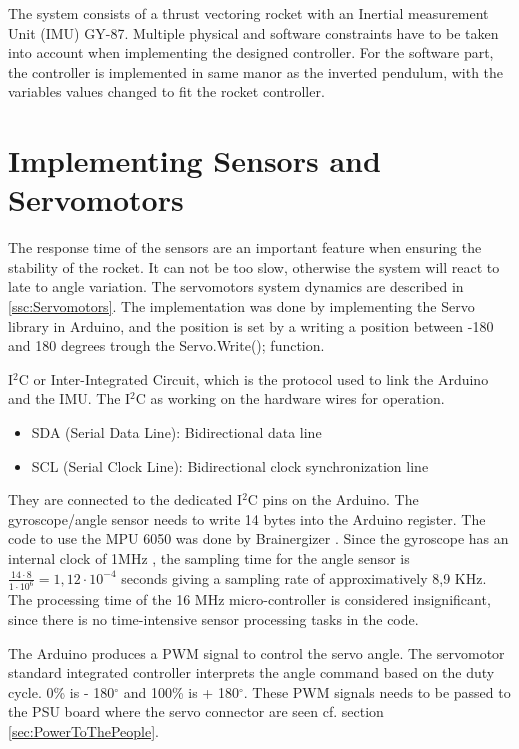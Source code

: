 The system consists of a thrust vectoring rocket with an Inertial measurement Unit (IMU) GY-87.
Multiple physical and software constraints have to be taken into account when implementing the designed controller. For the software part, the controller is implemented in same manor as the inverted pendulum, with the variables values changed to fit the rocket controller.  

\section{Implementing Sensors and Servomotors}
The response time of the sensors are an important feature when ensuring the stability of the rocket. It can not be too slow, otherwise the system will react to late to angle variation. The servomotors system dynamics are described in \autoref{ssc:Servomotors}. The implementation was done by implementing the Servo library in Arduino, and the position is set by a writing a position between -180 and 180 degrees trough the Servo.Write(); function. 

 I$^2$C or Inter-Integrated Circuit, which is the protocol used to link the Arduino and the IMU. The I$^2$C as working on the hardware wires for operation.
\begin{itemize}
	\item SDA (Serial Data Line): Bidirectional data line
	\item SCL (Serial Clock Line): Bidirectional clock synchronization line
\end{itemize}
They are connected to the dedicated I$^2$C pins on the Arduino.
The gyroscope/angle sensor needs to write 14 bytes into the Arduino register. The code to use the MPU 6050 was done by Brainergizer \cite{web:gyro_angle}. Since the gyroscope has an internal clock of 1MHz \cite{datasheet:MPU-6050}, the sampling time for the angle sensor is $\frac{14 \cdot 8}{1 \cdot 10^{6}} = 1,12 \cdot 10^{-4}$ seconds giving a sampling rate of approximatively 8,9 KHz. The processing time of the 16 MHz micro-controller is considered insignificant, since there is no time-intensive sensor processing tasks in the code. 

The Arduino produces a PWM signal to control the servo angle. The servomotor standard integrated controller interprets the angle command based on the duty cycle. 0\% is - 180$^{\circ}$ and 100\% is + 180$^{\circ}$. These PWM signals needs to be passed to the PSU board where the servo connector are seen cf. section \ref{sec:PowerToThePeople}.

